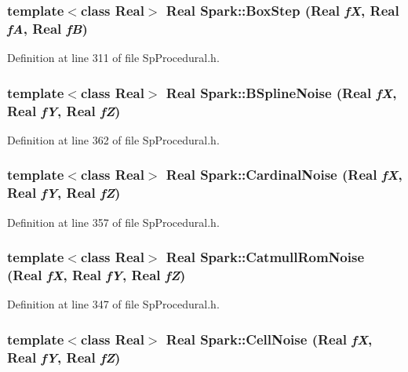 \subsubsection{\setlength{\rightskip}{0pt plus 5cm}template$<$class Real$>$ Real Spark::Box\-Step (Real {\em f\-X}, Real {\em f\-A}, Real {\em f\-B})}\label{namespaceSpark_a101}


Definition at line 311 of file Sp\-Procedural.h.
\subsubsection{\setlength{\rightskip}{0pt plus 5cm}template$<$class Real$>$ Real Spark::BSpline\-Noise (Real {\em f\-X}, Real {\em f\-Y}, Real {\em f\-Z})}\label{namespaceSpark_a110}


Definition at line 362 of file Sp\-Procedural.h.
\subsubsection{\setlength{\rightskip}{0pt plus 5cm}template$<$class Real$>$ Real Spark::Cardinal\-Noise (Real {\em f\-X}, Real {\em f\-Y}, Real {\em f\-Z})}\label{namespaceSpark_a109}


Definition at line 357 of file Sp\-Procedural.h.
\subsubsection{\setlength{\rightskip}{0pt plus 5cm}template$<$class Real$>$ Real Spark::Catmull\-Rom\-Noise (Real {\em f\-X}, Real {\em f\-Y}, Real {\em f\-Z})}\label{namespaceSpark_a107}


Definition at line 347 of file Sp\-Procedural.h.
\subsubsection{\setlength{\rightskip}{0pt plus 5cm}template$<$class Real$>$ Real Spark::Cell\-Noise (Real {\em f\-X}, Real {\em f\-Y}, Real {\em f\-Z})}\label{namespaceSpark_a73}


